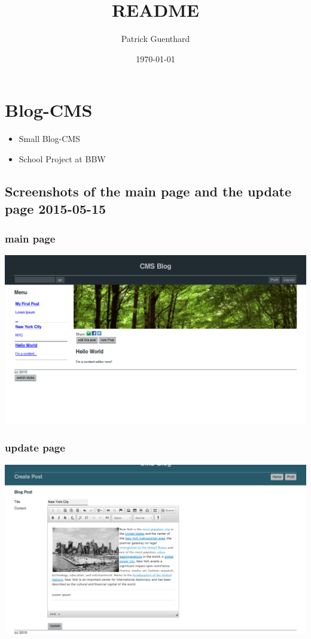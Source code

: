 \documentclass[11pt]{article}
\author{Patrick Guenthard}
\date{\today}
\title{README}
\begin{document}
\maketitle
\tableofcontents

\section{Blog-CMS}
\label{sec-1}

\begin{itemize}
\item Small Blog-CMS
\item School Project at BBW
\end{itemize}

\subsection{Screenshots of the main page and the update page 2015-05-15}
\label{sec-1-1}
\subsubsection{main page}
\label{sec-1-1-1}
\includegraphics[width=.9\linewidth]{./info/img/screenshot-main-2015-05-15.png}

\subsubsection{update page}
\label{sec-1-1-2}
\includegraphics[width=.9\linewidth]{./info/img/screenshot-update-2015-05-15.png}
\end{document}
